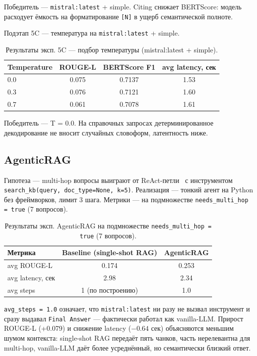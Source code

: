 \documentclass[a4paper,12pt]{extarticle}
\begin{document}
Победитель --- \texttt{mistral:latest} + simple. Citing снижает BERTScore: модель расходует ёмкость на форматирование \texttt{[N]} в ущерб семантической полноте.

Подэтап 5C --- температура на \texttt{mistral:latest} + simple.

\begin{table}[ht]
\caption{Результаты эксп. 5C --- подбор температуры (mistral:latest + simple).}
\label{tab:exp5c}
\centering
\begin{tabular}{lccc}
\toprule
Temperature & ROUGE-L & BERTScore F1 & avg latency, сек \\
\midrule
0.0 & 0.075 & 0.7137 & 1.53 \\
0.3 & 0.076 & 0.7121 & 1.60 \\
0.7 & 0.061 & 0.7078 & 1.61 \\
\bottomrule
\end{tabular}
\end{table}

Победитель --- T = 0.0. На справочных запросах детерминированное декодирование не вносит случайных словоформ, латентность ниже.

\subsection{AgenticRAG}

Гипотеза --- multi-hop вопросы выиграют от ReAct-петли~\cite{react} с инструментом \texttt{search\_kb(query, doc\_type=None, k=5)}. Реализация --- тонкий агент на Python без фреймворков, лимит 3 шага. Метрики --- на подмножестве \texttt{needs\_multi\_hop = true} (7 вопросов).

\begin{table}[ht]
\caption{Результаты эксп. AgenticRAG на подмножестве \texttt{needs\_multi\_hop = true} (7 вопросов).}
\label{tab:exp_agentic}
\centering
\begin{tabular}{lcc}
\toprule
Метрика & Baseline (single-shot RAG) & AgenticRAG \\
\midrule
avg ROUGE-L & 0.174 & 0.253 \\
avg latency, сек & 2.98 & 2.34 \\
avg steps & 1 (по построению) & 1.0 \\
\bottomrule
\end{tabular}
\end{table}

\texttt{avg\_steps = 1.0} означает, что \texttt{mistral:latest} ни разу не вызвал инструмент и сразу выдавал \texttt{Final Answer} --- фактически работал как vanilla-LLM. Прирост ROUGE-L (+0.079) и снижение latency ($-0.64$ сек) объясняются меньшим шумом контекста: single-shot RAG передаёт пять чанков, часть нерелевантна для multi-hop, vanilla-LLM даёт более усреднённый, но семантически близкий ответ.
\end{document}
